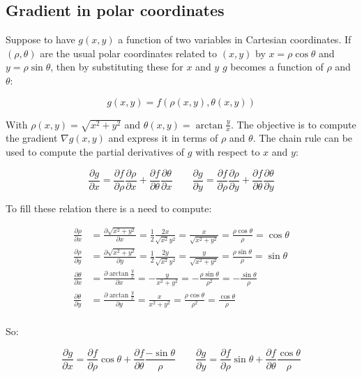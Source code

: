 	\subsection{Gradient in polar coordinates}
	Suppose to have $g(x, y)$ a function of two variables in Cartesian coordinates.
	If $(\rho, \theta)$ are the usual polar coordinates related to $(x, y)$ by $x = \rho\cos\theta$ and $y =\rho\sin\theta$, then by substituting these for $x$ and $y$ $g$ becomes a function of $\rho$ and $\theta$:

	$$g(x, y) = f(\rho(x, y), \theta(x, y))$$

	With $\rho(x,y) =\sqrt{x^2+y^2}$ and $\theta(x, y) = \arctan\frac{y}{x}$.
	The objective is to compute the gradient $\nabla g(x,y)$ and express it in terms of $\rho$ and $\theta$.
	The chain rule can be used to compute the partial derivatives of $g$ with respect to $x$ and $y$:

	$$\frac{\partial g}{\partial x} = \frac{\partial f}{\partial \rho}\frac{\partial \rho}{\partial x} + \frac{\partial f}{\partial \theta}\frac{\partial \theta}{\partial x}\qquad\frac{\partial g}{\partial y} = \frac{\partial f}{\partial \rho}\frac{\partial \rho}{\partial y} + \frac{\partial f}{\partial \theta}\frac{\partial \theta}{\partial y}$$

	To fill these relation there is a need to compute:

	\begin{align*}
		\frac{\partial\rho}{\partial x} &= \frac{\partial\sqrt{x^2+y^2}}{\partial x} = \frac{1}{2}\frac{2x}{\sqrt{x^2}{y^2}} = \frac{x}{\sqrt{x^2+y^2}} = \frac{\rho\cos\theta}{\rho} = \cos\theta\\
		\frac{\partial\rho}{\partial y} &= \frac{\partial\sqrt{x^2+y^2}}{\partial y} = \frac{1}{2}\frac{2y}{\sqrt{x^2}{y^2}} = \frac{y}{\sqrt{x^2+y^2}} = \frac{\rho\sin\theta}{\rho} = \sin\theta\\
		\frac{\partial\theta}{\partial x} &= \frac{\partial\arctan\frac{y}{x}}{\partial x} = -\frac{y}{x^2+y^2} = -\frac{\rho\sin\theta}{\rho^2} = -\frac{\sin\theta}{\rho}\\
		\frac{\partial\theta}{\partial y} &= \frac{\partial\arctan\frac{y}{x}}{\partial y} = \frac{x}{x^2+y^2} = \frac{\rho\cos\theta}{\rho^2} = \frac{\cos\theta}{\rho}\\
	\end{align*}

	So:

	$$\frac{\partial g}{\partial x} = \frac{\partial f}{\partial\rho}\cos\theta + \frac{\partial f}{\partial\theta}\frac{-\sin\theta}{\rho}\qquad \frac{\partial g}{\partial y} = \frac{\partial f}{\partial \rho}\sin\theta + \frac{\partial f}{\partial \theta}\frac{\cos\theta}{\rho}$$

